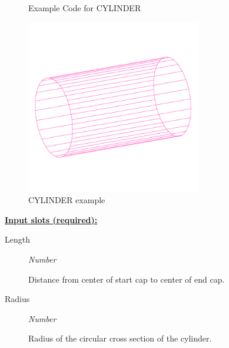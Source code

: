 \documentclass [11pt]{book}
\begin{document}
\begin{itemize}
\begin{figure}
\begin{lrbox}{\boxedverb}
\begin{minipage}{\linewidth}
{\begin{verbatim}
\end{verbatim}}
\end{minipage}
\end{lrbox}
\fbox{\usebox{\boxedverb}}

\caption{Example Code for CYLINDER}

\label{fig:example-code-CYLINDER}

\end{figure}

\begin{figure}
\begin{center}
\includegraphics[width=3in,height=3in]{../images/example-cylinder.pdf}
\end{center}

\caption{CYLINDER example}

\label{fig:CYLINDER}

\end{figure}





\textbf{
\underline{Input slots (required):}}

\begin{description}

\item [Length]
\emph{Number}

 Distance from center of start cap to center of end cap.




\item [Radius]
\emph{Number}

 Radius of the circular cross section of the cylinder.




\end{description}







\end{itemize}
\end{document}
